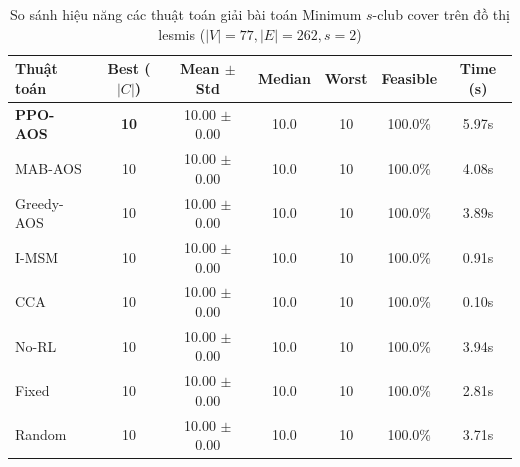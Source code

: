 \begin{table}[htbp]
\centering
\caption{So sánh hiệu năng các thuật toán giải bài toán Minimum $s$-club cover trên đồ thị lesmis ($|V|=77, |E|=262, s=2$)}
\label{tab:results_lesmis}
\begin{tabular}{lcccccc}
\hline
\textbf{Thuật toán} & \textbf{Best ($|C|$)} & \textbf{Mean $\pm$ Std} & \textbf{Median} & \textbf{Worst} & \textbf{Feasible} & \textbf{Time (s)} \\
\hline
\textbf{PPO-AOS} & \textbf{10} & 10.00 $\pm$ 0.00 & 10.0 & 10 & 100.0\% & 5.97s \\
MAB-AOS & 10 & 10.00 $\pm$ 0.00 & 10.0 & 10 & 100.0\% & 4.08s \\
Greedy-AOS & 10 & 10.00 $\pm$ 0.00 & 10.0 & 10 & 100.0\% & 3.89s \\
I-MSM & 10 & 10.00 $\pm$ 0.00 & 10.0 & 10 & 100.0\% & 0.91s \\
CCA & 10 & 10.00 $\pm$ 0.00 & 10.0 & 10 & 100.0\% & 0.10s \\
No-RL & 10 & 10.00 $\pm$ 0.00 & 10.0 & 10 & 100.0\% & 3.94s \\
Fixed & 10 & 10.00 $\pm$ 0.00 & 10.0 & 10 & 100.0\% & 2.81s \\
Random & 10 & 10.00 $\pm$ 0.00 & 10.0 & 10 & 100.0\% & 3.71s \\
\hline
\end{tabular}
\end{table}

